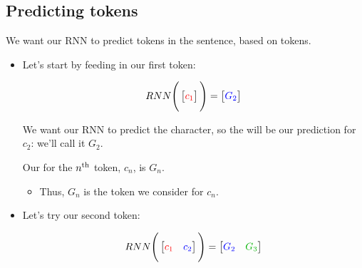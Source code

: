     \subsection{Predicting tokens}

        We want our RNN to predict  tokens in the sentence, based on  tokens.  


        \begin{itemize}
            \item Let's start by feeding in our first token:

            \begin{equation}
            RNN\Bigg(\begin{bmatrix}
                \textcolor{red}{c_1}
            \end{bmatrix}\Bigg)
            =
            \begin{bmatrix}
                \textcolor{blue}{G_2}
            \end{bmatrix}
        \end{equation}

        We want our RNN to predict the  character, so the  will be our prediction for $c_2$: we'll call it $G_2$.\\

        \begin{notation}
            Our  for the $n^{ \text{th} }$ token, $c_n$, is $G_n$.

            \begin{itemize}
                \item Thus, $G_n$ is the token we consider for $c_n$.
            \end{itemize}
        \end{notation}


        


        \phantom{}

        \phantom{}

        \item Let's try our second token:

        \begin{equation}
            RNN\Bigg(\begin{bmatrix}
                \red{c_1} & \blu{c_2}
            \end{bmatrix}\Bigg)
            =
            \begin{bmatrix}
                \blu{G_2} & \grn{G_3}
            \end{bmatrix}
        \end{equation}
        \end{itemize}


